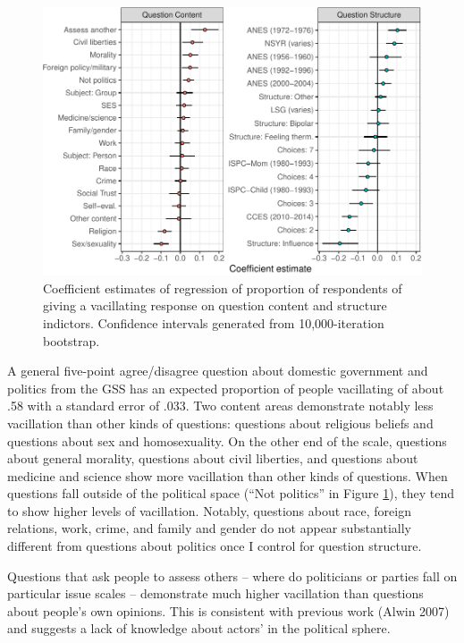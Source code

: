 \documentclass[12pt,]{article}
\begin{document}
\begin{figure}
\centering
\includegraphics{ambivalence_everywhere_files/figure-latex/vacboot-1.pdf}
\caption{\label{fig:vacboot}Coefficient estimates of regression of proportion of respondents of giving a vacillating response on question content and structure indictors. Confidence intervals generated from 10,000-iteration bootstrap.}
\end{figure}

A general five-point agree/disagree question about domestic government and politics from the GSS has an expected proportion of people vacillating of about .58 with a standard error of .033. Two content areas demonstrate notably less vacillation than other kinds of questions: questions about religious beliefs and questions about sex and homosexuality. On the other end of the scale, questions about general morality, questions about civil liberties, and questions about medicine and science show more vacillation than other kinds of questions. When questions fall outside of the political space (``Not politics'' in Figure \ref{fig:vacboot}), they tend to show higher levels of vacillation. Notably, questions about race, foreign relations, work, crime, and family and gender do not appear substantially different from questions about politics once I control for question structure.

Questions that ask people to assess others -- where do politicians or parties fall on particular issue scales -- demonstrate much higher vacillation than questions about people's own opinions. This is consistent with previous work (Alwin 2007) and suggests a lack of knowledge about actors' in the political sphere.
\end{document}
